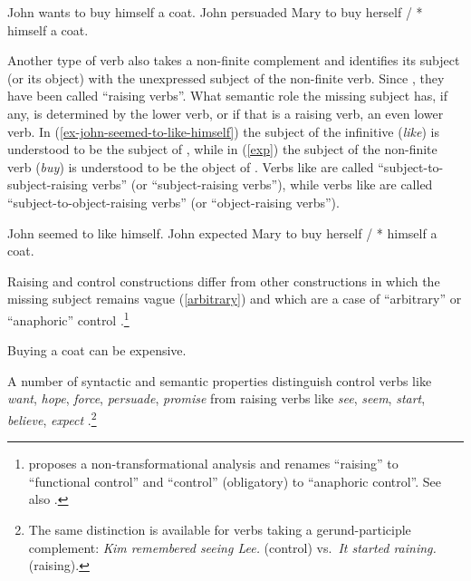 \eal
\label{ex-equi}
\ex John wants to buy himself a coat. \label{equi1}
\ex John persuaded Mary to buy herself / * himself a coat.\label{equi2}
\zl

Another type of verb also takes a non-finite complement and identifies its subject (or its object)
with the unexpressed subject of the non-finite verb. Since \citet{Postal1974}, they have been called
``raising verbs''. What semantic role the missing subject has, if any, is determined by the lower
verb, or if that is a raising verb, an even lower verb. In (\ref{ex-john-seemed-to-like-himself}) the subject of the
infinitive (\emph{like}) is understood to be the subject of , while in (\ref{exp})
the subject of the non-finite verb (\emph{buy}) is understood to be the object of
. Verbs like  are called ``subject-to-subject-raising verbs'' (or
``subject-raising verbs''), while verbs like  are called ``subject-to-object-raising
verbs'' (or ``object-raising verbs''). 

\eal
\ex John seemed to like himself.\label{ex-john-seemed-to-like-himself}
\ex John expected Mary to buy herself / * himself a coat. \label{exp}
\zl
 
Raising and control constructions differ from other constructions in which the missing subject
remains vague (\ref{arbitrary}) and which are a case of ``arbitrary'' or ``anaphoric'' control
\parencites[--76]{Chomsky1981}[]{Bresnan1982}.\footnote{\citet{Bresnan1982} proposes
  a non-transformational analysis and renames ``raising'' to ``functional control'' and ``control''
  (obligatory) to ``anaphoric control''. See also .} 
 
\ea
Buying a coat can be expensive.\label{arbitrary}
\z
  
A number of syntactic and semantic properties distinguish control verbs like \emph{want}, \emph{hope},
\emph{force}, \emph{persuade}, \emph{promise} from raising verbs like \emph{see},
\emph{seem}, \emph{start}, \emph{believe}, \emph{expect} \citep{Rosenbaum67a-u,Postal1974,Bresnan1982}.\footnote{%
  The same distinction is available for verbs taking a gerund-participle complement: 
  \emph{Kim remembered seeing Lee.} (control) vs.\  \emph{It started raining.} (raising).}

